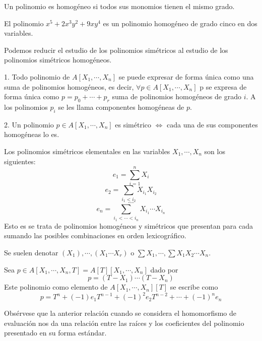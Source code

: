 \begin{definition}
Un polinomio es homogéneo si todos sus monomios tienen el mismo grado.
\end{definition}

\begin{example}
El polinomio $x^5 + 2x^3y^2+9xy^4$ es un polinomio homogéneo de grado cinco en dos variables.  
\end{example}

Podemos reducir el estudio de los polinomios simétricos al estudio de los polinomios simétricos homogéneos. 

\begin{proposition}
1. Todo polinomio de $A[X_1,\cdots,X_n]$ se puede expresar de forma única como una suma de polinomios homogéneos, es decir, $\forall p \in A[X_1,\cdots,X_n]$ p se expresa de forma única como $p = p_0 + \cdots + p_r$ suma de polinomios homogéneos de grado $i$. A los polinomios $p_i$ se les llama componentes homogéneas de $p$. 

2. Un polinomio $p \in A[X_1,\cdots,X_n]$ es simétrico $\iff$ cada una de sus componentes homogéneas lo es.
\end{proposition}

\begin{definition}
Los polinomios simétricos elementales en las variables $X_1,\cdots,X_n$ son los siguientes: $$e_1 = \sum_{i = 1}^n X_i$$ $$e_2 = \sum_{i_1 < i_2} X_{i_1}X_{i_2}$$ $$\cdots$$ $$e_n = \sum_{i_1 < \cdots < i_n} X_{i_1} \cdots X_{i_n}$$ Esto es se trata de polinomios homogéneos y simétricos que presentan para cada sumando las posibles combinaciones en orden lexicográfico. 

Se suelen denotar $(X_1),\cdots,(X_1 \cdots X_r)$ o $\sum X_1, \cdots , \sum X_1X_2 \cdots X_n$.
\end{definition}

\begin{proposition}
Sea $p \in A[X_1,\cdots,X_n,T] = A[T][X_1,\cdots,X_n]$ dado por $$p = (T-X_1) \cdots (T-X_n)$$ Este polinomio como elemento de $A[X_1,\cdots,X_n][T]$ se escribe como $$p = T^n + (-1)e_1T^{n-1} + (-1)^2e_2T^{n-2}+\cdots+(-1)^ne_n$$
\end{proposition}

Obsérvese que la anterior relación cuando se considera el homomorfismo de evaluación nos da una relación entre las raíces y los coeficientes del polinomio presentado en su forma estándar. 

